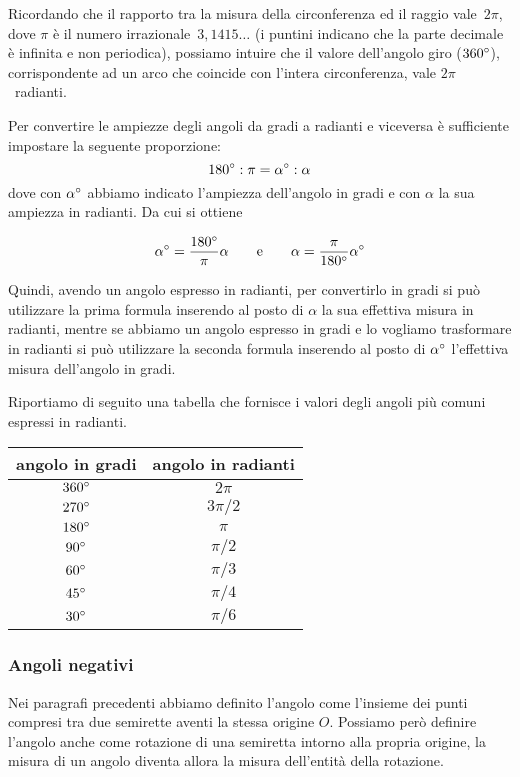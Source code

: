 Ricordando che il rapporto tra la misura della circonferenza ed il raggio vale~$2\pi$, dove $\pi$ è il numero irrazionale~$3,1415\ldots{}$ (i puntini indicano che la parte decimale è infinita e non periodica), possiamo intuire che il valore dell'angolo giro ($360{}^{\circ}$), corrispondente ad un arco che coincide con l'intera circonferenza, vale $2\pi$~radianti.

Per convertire le ampiezze degli angoli da gradi a radianti e viceversa è sufficiente impostare la seguente proporzione:
\[180{}^{\circ} : \pi = \alpha{}^{\circ} : \alpha\]
dove con $\alpha{}^{\circ}$ abbiamo indicato l'ampiezza dell'angolo in gradi e con $\alpha$ la sua ampiezza in radianti. Da cui si ottiene

\[\alpha{}^{\circ} = \dfrac{180{}^{\circ}}{\pi}\alpha\qquad\text{e}\qquad\alpha = \dfrac{\pi}{180{}^{\circ}}\alpha{}^{\circ}\]

Quindi, avendo un angolo espresso in radianti, per convertirlo in gradi si può utilizzare la prima formula inserendo al posto di $\alpha$ la sua effettiva misura in radianti, mentre se abbiamo un angolo espresso in gradi e lo vogliamo trasformare in radianti si può utilizzare la seconda formula inserendo al posto di $\alpha{}^{\circ}$ l'effettiva misura dell'angolo in gradi.

Riportiamo di seguito una tabella che fornisce i valori degli angoli più comuni espressi in radianti.

\begin{center}
\begin{tabular}{cc}
\toprule
angolo in gradi	& angolo in radianti\\
\midrule
$360{}^{\circ}$ & $2\pi$\\
$270{}^{\circ}$ & $3\pi/2$\\
$180{}^{\circ}$ & $\pi$\\
$90{}^{\circ}$ & $\pi/2$\\
$60{}^{\circ}$ & $\pi/3$\\
$45{}^{\circ}$ & $\pi/4$\\
$30{}^{\circ}$ & $\pi/6$\\
\bottomrule
\end{tabular}
\end{center}

\subsubsection{Angoli negativi}

Nei paragrafi precedenti abbiamo definito l'angolo come l'insieme dei punti compresi tra due semirette aventi la stessa origine $O$. Possiamo però definire l'angolo anche come rotazione di una semiretta intorno alla propria origine, la misura di un angolo diventa allora la misura dell'entità della rotazione.

